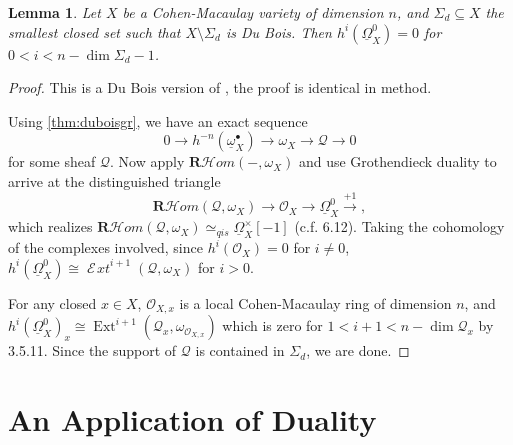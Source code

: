 \documentclass[proquest]{uwthesis}[2014/11/13]
\newtheorem{lemma}[theorem]{Lemma}
\theoremstyle{definition}
\DeclareMathOperator{\Ext}{Ext}
\DeclareMathOperator{\cExt}{\mathscr{E} \! \textit{xt}}
\newcommand{\cHom}{\mathcal{H} \textit{om}}
\newcommand{\OO}{\mathcal{O}}
\newcommand{\qis}{\simeq_{qis}}
\newcommand{\bR}{\textbf{R}}
\newcommand{\DB}{\underline{\Omega}}
\newcommand{\db}{\underline{\omega}^\bullet}
\begin{document}
\begin{lemma}
	Let $X$ be a Cohen-Macaulay variety of dimension $n$, and $\Sigma_d \subseteq X$ the smallest closed set such that $X \setminus \Sigma_d$ is Du Bois.
	Then $h^i (\DB_X^0) = 0$ for $0 < i < n - \dim \Sigma_d - 1$.
\end{lemma}
\begin{proof}
	This is a Du Bois version of \cite[Lemma~3.3]{Kovacs1999}, the proof is identical in method.
	
	Using \ref{thm:duboisgr}, we have an exact sequence
	\[
		0 \rightarrow h^{-n}(\db_X) \rightarrow \omega_X \rightarrow \mathscr{Q} \rightarrow 0
	\]
	for some sheaf $\mathscr{Q}$.
	Now apply $\bR \cHom (-, \omega_X)$ and use Grothendieck duality to arrive at the distinguished triangle
	\[
		\bR \cHom(\mathscr{Q}, \omega_X) \rightarrow \OO_X \rightarrow \DB_X^0 \xrightarrow{+1},
	\]
	which realizes $\bR \cHom(\mathscr{Q}, \omega_X) \qis \DB_X^\times[-1]$ (c.f. \cite{Kollar2013} 6.12).
	Taking the cohomology of the complexes involved, since $h^i(\OO_X) = 0$ for $i \neq 0$, $h^i(\DB_X^0) \cong \cExt^{i+1}(\mathscr{Q}, \omega_X)$ for $i > 0$.
	
	For any closed $x \in X$, $\OO_{X,x}$ is a local Cohen-Macaulay ring of dimension $n$, and $h^i(\DB_X^0)_x \cong \Ext^{i+1}(\mathscr{Q}_x, \omega_{\OO_{X,x}})$ which is zero for $1 < i+1 < n - \dim \mathscr{Q}_x$ by \cite{Bruns1993} 3.5.11. Since the support of $\mathscr{Q}$ is contained in $\Sigma_d$, we are done.
\end{proof}

\chapter{An Application of Duality}
\label{chp:applications}
\end{document}
